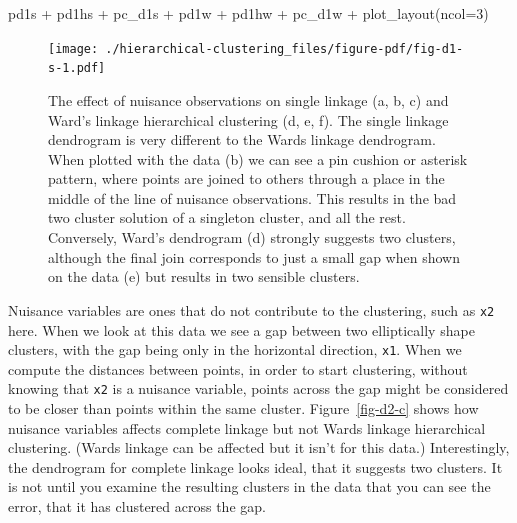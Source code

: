 \documentclass[
  letterpaper,
]{book}
\newenvironment{Shaded}{\begin{snugshade}}{\end{snugshade}}
\newcommand{\AttributeTok}[1]{\textcolor[rgb]{0.40,0.45,0.13}{#1}}
\newcommand{\DecValTok}[1]{\textcolor[rgb]{0.68,0.00,0.00}{#1}}
\newcommand{\FunctionTok}[1]{\textcolor[rgb]{0.28,0.35,0.67}{#1}}
\newcommand{\NormalTok}[1]{\textcolor[rgb]{0.00,0.23,0.31}{#1}}
\newcommand{\SpecialCharTok}[1]{\textcolor[rgb]{0.37,0.37,0.37}{#1}}
\begin{document}
\begin{Shaded}
\begin{Highlighting}[]
\NormalTok{pd1s }\SpecialCharTok{+}\NormalTok{ pd1hs }\SpecialCharTok{+}\NormalTok{ pc\_d1s }\SpecialCharTok{+} 
\NormalTok{  pd1w }\SpecialCharTok{+}\NormalTok{ pd1hw }\SpecialCharTok{+}\NormalTok{ pc\_d1w }\SpecialCharTok{+}
  \FunctionTok{plot\_layout}\NormalTok{(}\AttributeTok{ncol=}\DecValTok{3}\NormalTok{)}
\end{Highlighting}
\end{Shaded}

\begin{figure}[H]

{\centering \texttt{[image: ./hierarchical-clustering\_files/figure-pdf/fig-d1-s-1.pdf]}

}

\caption{\label{fig-d1-s}The effect of nuisance observations on single
linkage (a, b, c) and Ward's linkage hierarchical clustering (d, e, f).
The single linkage dendrogram is very different to the Wards linkage
dendrogram. When plotted with the data (b) we can see a pin cushion or
asterisk pattern, where points are joined to others through a place in
the middle of the line of nuisance observations. This results in the bad
two cluster solution of a singleton cluster, and all the rest.
Conversely, Ward's dendrogram (d) strongly suggests two clusters,
although the final join corresponds to just a small gap when shown on
the data (e) but results in two sensible clusters.}

\end{figure}

Nuisance variables are ones that do not contribute to the clustering,
such as \texttt{x2} here. When we look at this data we see a gap between
two elliptically shape clusters, with the gap being only in the
horizontal direction, \texttt{x1}. When we compute the distances between
points, in order to start clustering, without knowing that \texttt{x2}
is a nuisance variable, points across the gap might be considered to be
closer than points within the same cluster. Figure~\ref{fig-d2-c} shows
how nuisance variables affects complete linkage but not Wards linkage
hierarchical clustering. (Wards linkage can be affected but it isn't for
this data.) Interestingly, the dendrogram for complete linkage looks
ideal, that it suggests two clusters. It is not until you examine the
resulting clusters in the data that you can see the error, that it has
clustered across the gap.
\end{document}
